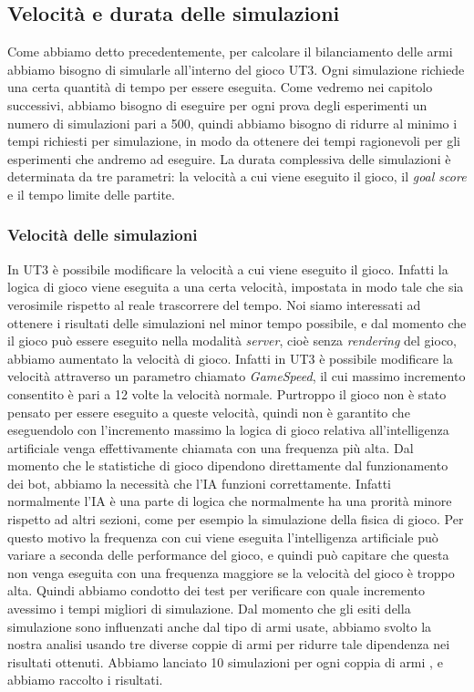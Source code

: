 \documentclass[12pt, italian]{toptesi}
\begin{document}
\subsection{Velocità e durata delle simulazioni}
Come abbiamo detto precedentemente, per calcolare il bilanciamento delle armi abbiamo bisogno di simularle all'interno del gioco UT3.
Ogni simulazione richiede una certa quantità di tempo per essere eseguita. Come vedremo nei capitolo successivi, abbiamo bisogno di eseguire per ogni prova degli esperimenti un numero di simulazioni pari a 500, quindi abbiamo bisogno di ridurre al minimo i tempi richiesti per simulazione, in modo da ottenere dei tempi ragionevoli per gli esperimenti che andremo ad eseguire.
La durata complessiva delle simulazioni è determinata da tre parametri: la velocità a cui viene eseguito il gioco, il \emph{goal score} e il tempo limite delle partite.

\subsubsection{Velocità delle simulazioni}
In UT3 è possibile modificare la velocità a cui viene eseguito il gioco. Infatti la logica di gioco viene eseguita a una certa velocità, impostata in modo tale che sia verosimile rispetto al reale trascorrere del tempo.
Noi siamo interessati ad ottenere i risultati delle simulazioni nel minor tempo possibile, e dal momento che il gioco può essere eseguito nella modalità \emph{server}, cioè senza \emph{rendering} del gioco, abbiamo aumentato la velocità di gioco. Infatti in UT3 è possibile modificare la velocità attraverso un parametro chiamato \emph{GameSpeed}, il cui massimo incremento consentito è pari a 12 volte la velocità normale.
Purtroppo il gioco non è stato pensato per essere eseguito a queste velocità, quindi non è garantito che eseguendolo con l'incremento massimo la logica di gioco relativa all'intelligenza artificiale venga effettivamente chiamata con una frequenza più alta. Dal momento che le statistiche di gioco dipendono direttamente dal funzionamento dei bot, abbiamo la necessità che l'IA funzioni correttamente.
Infatti normalmente l'IA è una parte di logica che normalmente ha una prorità minore rispetto ad altri sezioni, come per esempio la simulazione della fisica di gioco.
Per questo motivo la frequenza con cui viene eseguita l'intelligenza artificiale può variare a seconda delle performance del gioco, e quindi può capitare che questa non venga eseguita con una frequenza maggiore se la velocità del gioco è troppo alta.
Quindi abbiamo condotto dei test per verificare con quale incremento avessimo i tempi migliori di simulazione. Dal momento che gli esiti della simulazione sono influenzati anche dal tipo di armi usate, abbiamo svolto la nostra analisi usando tre diverse coppie di armi per ridurre tale dipendenza nei risultati ottenuti.
Abbiamo lanciato 10 simulazioni per ogni coppia di armi , e abbiamo raccolto i risultati.
\end{document}
